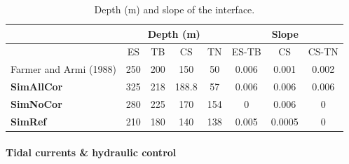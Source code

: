 \begin{table}[!h]
 \centering
  \begin{tabular}{|l|c|c|c|c||c|c|c|}
 \hline
  & \multicolumn{4}{c||}{Depth (m)} & \multicolumn{3}{c|}{Slope}\\
  \hline
    & ES & TB & CS & TN& ES-TB & CS & CS-TN\\
   \hline
   Farmer and Armi (1988) & 250 & 200 & 150 & 50 & 0.006 & 0.001 & 0.002\\
   \hline
   \textbf{SimAllCor} & 325 & 218 & 188.8 & 57 & 0.006 & 0.006 & 0.006\\
   \hline
   \textbf{SimNoCor} & 280 & 225 & 170 & 154& 0 & 0.006 & 0\\
   \hline
   \textbf{SimRef} & 210 & 180 & 140 & 138 & 0.005 & 0.0005 & 0\\
  \hline
 \end{tabular}
 \caption{Depth (m) and slope of the interface.}
 \label{tabdepth}
\end{table}

 
\paragraph{Tidal currents \& hydraulic control}



